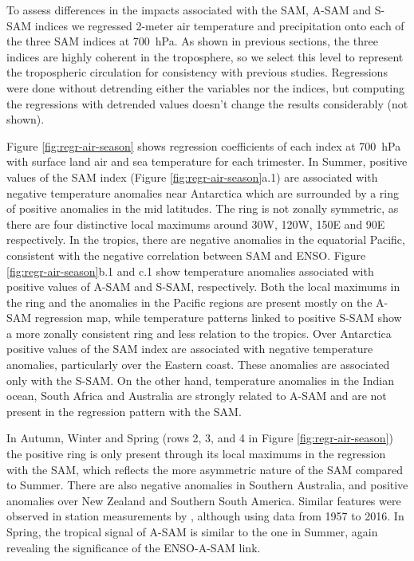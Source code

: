 \documentclass[smallextended]{svjour3}       %
\begin{document}
To assess differences in the impacts associated with the SAM, A\nobreakdash-SAM and S\nobreakdash-SAM indices we regressed 2-meter air temperature and precipitation onto each of the three SAM indices at 700~hPa.
As shown in previous sections, the three indices are highly coherent in the troposphere, so we select this level to represent the tropospheric circulation for consistency with previous studies.
Regressions were done without detrending either the variables nor the indices, but computing the regressions with detrended values doesn't change the results considerably (not shown).

Figure \ref{fig:regr-air-season} shows regression coefficients of each index at 700~hPa with surface land air and sea temperature for each trimester.
In Summer, positive values of the SAM index (Figure \ref{fig:regr-air-season}a.1) are associated with negative temperature anomalies near Antarctica which are surrounded by a ring of positive anomalies in the mid latitudes.
The ring is not zonally symmetric, as there are four distinctive local maximums around 30\degree W, 120\degree W, 150\degree E and 90\degree E respectively.
In the tropics, there are negative anomalies in the equatorial Pacific, consistent with the negative correlation between SAM and ENSO.
Figure \ref{fig:regr-air-season}b.1 and c.1 show temperature anomalies associated with positive values of A\nobreakdash-SAM and S\nobreakdash-SAM, respectively.
Both the local maximums in the ring and the anomalies in the Pacific regions are present mostly on the A\nobreakdash-SAM regression map, while temperature patterns linked to positive S\nobreakdash-SAM show a more zonally consistent ring and less relation to the tropics.
Over Antarctica positive values of the SAM index are associated with negative temperature anomalies, particularly over the Eastern coast.
These anomalies are associated only with the S\nobreakdash-SAM.
On the other hand, temperature anomalies in the Indian ocean, South Africa and Australia are strongly related to A\nobreakdash-SAM and are not present in the regression pattern with the SAM.

In Autumn, Winter and Spring (rows 2, 3, and 4 in Figure \ref{fig:regr-air-season}) the positive ring is only present through its local maximums in the regression with the SAM, which reflects the more asymmetric nature of the SAM compared to Summer.
There are also negative anomalies in Southern Australia, and positive anomalies over New Zealand and Southern South America.
Similar features were observed in station measurements by \citet{jones2019}, although using data from 1957 to 2016.
In Spring, the tropical signal of A\nobreakdash-SAM is similar to the one in Summer, again revealing the significance of the ENSO-A\nobreakdash-SAM link.
\end{document}
